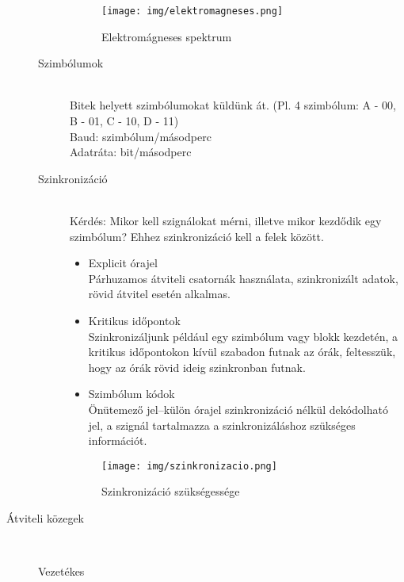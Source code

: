\documentclass[margin=0px]{article}
\begin{document}
\begin{description}
\begin{description}
                \begin{figure}[H]
                    \centering
                    \texttt{[image: img/elektromagneses.png]}
                    \caption{Elektromágneses spektrum}
                \end{figure}
            \item[Szimbólumok] \hfill \\
                Bitek helyett szimbólumokat küldünk át. (Pl. 4 szimbólum: A - 00, B - 01, C - 10, D - 11)\\
                Baud: szimbólum/másodperc \\
                Adatráta: bit/másodperc
            \item[Szinkronizáció] \hfill \\
                Kérdés: Mikor kell szignálokat mérni, illetve mikor kezdődik egy szimbólum? Ehhez szinkronizáció kell a felek között.
                \begin{itemize}
                    \item Explicit órajel \\
                          Párhuzamos átviteli csatornák használata, szinkronizált adatok, rövid átvitel esetén alkalmas.
                    \item Kritikus időpontok \\
                          Szinkronizáljunk például egy szimbólum vagy blokk kezdetén, a kritikus időpontokon kívül szabadon futnak az órák, feltesszük, hogy az órák rövid ideig szinkronban futnak.
                    \item Szimbólum kódok \\
                          Önütemező jel–külön órajel szinkronizáció nélkül dekódolható jel, a szignál tartalmazza a szinkronizáláshoz szükséges információt.
                \end{itemize}
                \begin{figure}[H]
                    \centering
                    \texttt{[image: img/szinkronizacio.png]}
                    \caption{Szinkronizáció szükségessége}
                \end{figure}
        \end{description}
    \item[Átviteli közegek] \hfill \\
        \begin{description}
            \item[Vezetékes] \hfill

\end{description}
\end{description}
\end{document}
